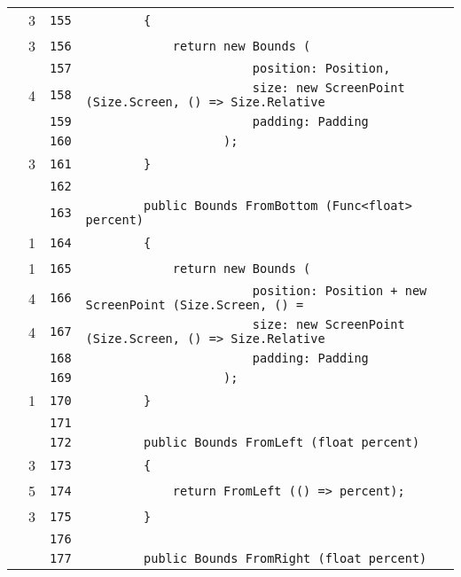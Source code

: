 \documentclass[a4paper,10pt]{article}
\begin{document}
\begin{longtable}[l]{lrrl}
\cellcolor{green} & 3 & \verb~155~ & \verb~        {~\\
\cellcolor{green} & 3 & \verb~156~ & \verb~            return new Bounds (~\\
\cellcolor{gray} &  & \verb~157~ & \verb~                       position: Position,~\\
\cellcolor{green} & 4 & \verb~158~ & \verb~                       size: new ScreenPoint (Size.Screen, () => Size.Relative~\\
\cellcolor{gray} &  & \verb~159~ & \verb~                       padding: Padding~\\
\cellcolor{gray} &  & \verb~160~ & \verb~                   );~\\
\cellcolor{green} & 3 & \verb~161~ & \verb~        }~\\
\cellcolor{gray} &  & \verb~162~ & \verb~~\\
\cellcolor{gray} &  & \verb~163~ & \verb~        public Bounds FromBottom (Func<float> percent)~\\
\cellcolor{green} & 1 & \verb~164~ & \verb~        {~\\
\cellcolor{green} & 1 & \verb~165~ & \verb~            return new Bounds (~\\
\cellcolor{green} & 4 & \verb~166~ & \verb~                       position: Position + new ScreenPoint (Size.Screen, () =~\\
\cellcolor{green} & 4 & \verb~167~ & \verb~                       size: new ScreenPoint (Size.Screen, () => Size.Relative~\\
\cellcolor{gray} &  & \verb~168~ & \verb~                       padding: Padding~\\
\cellcolor{gray} &  & \verb~169~ & \verb~                   );~\\
\cellcolor{green} & 1 & \verb~170~ & \verb~        }~\\
\cellcolor{gray} &  & \verb~171~ & \verb~~\\
\cellcolor{gray} &  & \verb~172~ & \verb~        public Bounds FromLeft (float percent)~\\
\cellcolor{green} & 3 & \verb~173~ & \verb~        {~\\
\cellcolor{green} & 5 & \verb~174~ & \verb~            return FromLeft (() => percent);~\\
\cellcolor{green} & 3 & \verb~175~ & \verb~        }~\\
\cellcolor{gray} &  & \verb~176~ & \verb~~\\
\cellcolor{gray} &  & \verb~177~ & \verb~        public Bounds FromRight (float percent)~\\

\end{longtable}
\end{document}
